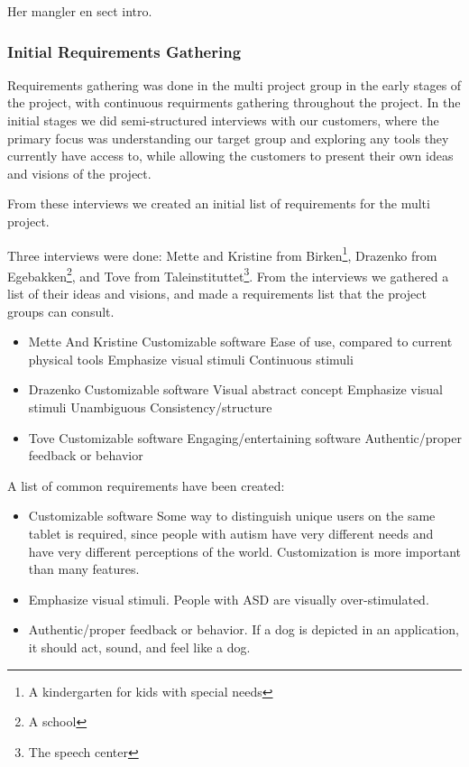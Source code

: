 Her mangler en sect intro.
\subsubsection*{Initial Requirements Gathering}
Requirements gathering was done in the multi project group in the early stages of the project, with continuous requirments gathering throughout the project.
In the initial stages we did semi-structured interviews with our customers, where the primary focus was understanding our target group and exploring any tools they currently have access to, while allowing the customers to present their own ideas and visions of the project.

From these interviews we created an initial list of requirements for the multi project.

Three interviews were done: Mette and Kristine from Birken\footnote{A kindergarten for kids with special needs}, Drazenko from Egebakken\footnote{A school}, and Tove from Taleinstituttet\footnote{The speech center}.
From the interviews we gathered a list of their ideas and visions, and made a requirements list that the project groups can consult.

\begin{itemize}
 \item Mette And Kristine 
  \subitem Customizable software
  \subitem Ease of use, compared to current physical tools
  \subitem Emphasize visual stimuli
  \subitem Continuous stimuli 
 \item Drazenko
  \subitem Customizable software
  \subitem Visual abstract concept
  \subitem Emphasize visual stimuli
  \subitem Unambiguous
  \subitem Consistency/structure
 \item Tove 
  \subitem Customizable software
  \subitem Engaging/entertaining software
  \subitem Authentic/proper feedback or behavior
\end{itemize}

A list of common requirements have been created:

\begin{itemize}
 \item Customizable software
  \subitem Some way to distinguish unique users on the same tablet is required, since people with autism have very different needs and have very different perceptions of the world.
  \subitem Customization is more important than many features.
 \item Emphasize visual stimuli.
  \subitem People with ASD are visually over-stimulated.
 \item Authentic/proper feedback or behavior.
  \subitem If a dog is depicted in an application, it should act, sound, and feel like a dog.
\end{itemize}

